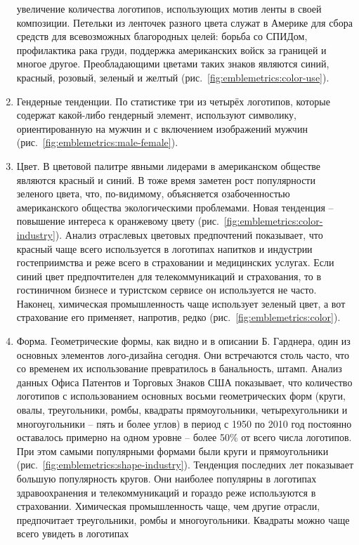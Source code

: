 \begin{enumerate}
  увеличение количества логотипов, использующих мотив ленты в своей композиции. Петельки из ленточек
  разного цвета служат в Америке для сбора средств для всевозможных благородных целей: борьба со
  СПИДом, профилактика рака груди, поддержка американских войск за границей и многое
  другое. Преобладающими цветами таких знаков являются синий, красный, розовый, зеленый и желтый
  (рис.~\ref{fig:emblemetrics:color-use}).
\item Гендерные тенденции. По статистике три из четырёх логотипов, которые содержат какой-либо
  гендерный элемент, используют символику, ориентированную на мужчин и с включением изображений
  мужчин (рис.~\ref{fig:emblemetrics:male-female}).
\item Цвет. В цветовой палитре явными лидерами в американском обществе являются красный и синий. В
  тоже время заметен рост популярности зеленого цвета, что, по-видимому, объясняется  озабоченностью
  американского общества экологическими проблемами. Новая тенденция -- повышение интереса к
  оранжевому цвету (рис.~\ref{fig:emblemetrics:color-industry}). Анализ отраслевых цветовых
  предпочтений показывает, что красный чаще всего используется в логотипах напитков и индустрии
  гостеприимства и реже всего в страховании и медицинских услугах. Если  синий цвет предпочтителен
  для  телекоммуникаций и страхования, то в гостиничном бизнесе и туристском сервисе он используется
  не часто. Наконец, химическая промышленность чаще использует зеленый цвет, а вот страхование его
  применяет, напротив, редко (рис.~\ref{fig:emblemetrics:color}).
\item Форма. Геометрические формы, как видно и в описании Б. Гарднера, один из основных элементов
  лого-дизайна сегодня. Они встречаются столь часто, что со временем их использование превратилось в
  банальность, штамп. Анализ данных Офиса Патентов и Торговых Знаков США показывает, что  количество
  логотипов с использованием основных восьми геометрических форм (круги, овалы, треугольники, ромбы,
  квадраты прямоугольники, четырехугольники и многоугольники -- пять и более  углов)  в период с
  1950 по 2010 год постоянно оставалось примерно на одном уровне -- более 50\% от всего числа
  логотипов. При этом самыми популярными формами были круги и прямоугольники
  (рис.~\ref{fig:emblemetrics:shape-industry}). Тенденция последних лет показывает большую
  популярность кругов. Они наиболее популярны в логотипах здравоохранения и телекоммуникаций и
  гораздо реже используются в страховании. Химическая промышленность чаще, чем другие отрасли,
  предпочитает треугольники, ромбы и многоугольники. Квадраты можно чаще всего увидеть в логотипах

\end{enumerate}
